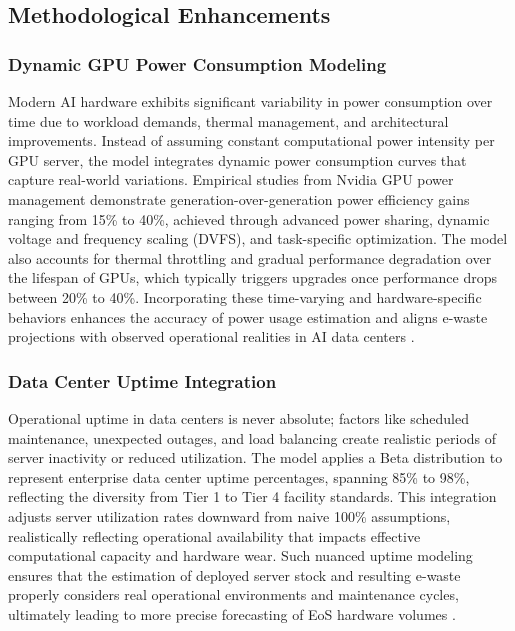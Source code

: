 \documentclass[a4paper, 12pt]{article}
\begin{document}
\subsection{Methodological Enhancements}
\subsubsection{Dynamic GPU Power Consumption Modeling}
Modern AI hardware exhibits significant variability in power consumption over time due to workload demands, thermal management, and architectural improvements. Instead of assuming constant computational power intensity per GPU server, the model integrates dynamic power consumption curves that capture real-world variations. Empirical studies from Nvidia GPU power management demonstrate generation-over-generation power efficiency gains ranging from 15\% to 40\%, achieved through advanced power sharing, dynamic voltage and frequency scaling (DVFS), and task-specific optimization. The model also accounts for thermal throttling and gradual performance degradation over the lifespan of GPUs, which typically triggers upgrades once performance drops between 20\% to 40\%. Incorporating these time-varying and hardware-specific behaviors enhances the accuracy of power usage estimation and aligns e-waste projections with observed operational realities in AI data centers \citep{you-2023, nvidia-2023, wang_2024_ewaste}.

\subsubsection{Data Center Uptime Integration}
Operational uptime in data centers is never absolute; factors like scheduled maintenance, unexpected outages, and load balancing create realistic periods of server inactivity or reduced utilization. The model applies a Beta distribution to represent enterprise data center uptime percentages, spanning 85\% to 98\%, reflecting the diversity from Tier 1 to Tier 4 facility standards. This integration adjusts server utilization rates downward from naive 100\% assumptions, realistically reflecting operational availability that impacts effective computational capacity and hardware wear. Such nuanced uptime modeling ensures that the estimation of deployed server stock and resulting e-waste properly considers real operational environments and maintenance cycles, ultimately leading to more precise forecasting of EoS hardware volumes \citep{unknown-author-no-date, operations-2024, wang_2024_ewaste}.
\end{document}
